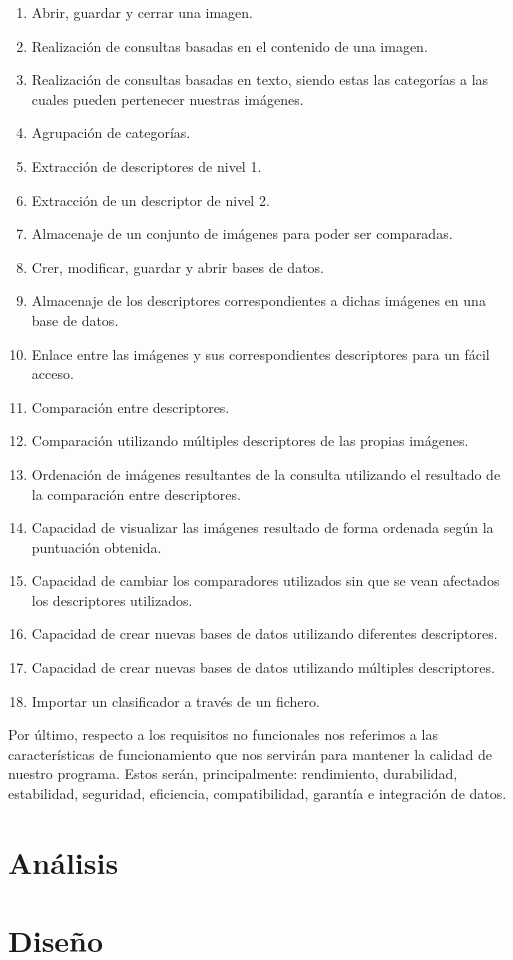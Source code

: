 \begin{enumerate}
\item Abrir, guardar y cerrar una imagen.
\item Realización de consultas basadas en el contenido de una imagen.
\item Realización de consultas basadas en texto, siendo estas las categorías a las cuales pueden pertenecer nuestras imágenes.
\item Agrupación de categorías.
\item Extracción de descriptores de nivel 1.
\item Extracción de un descriptor de nivel 2.
\item Almacenaje de un conjunto de imágenes para poder ser comparadas.
\item Crer, modificar, guardar y abrir bases de datos.
\item Almacenaje de los descriptores correspondientes a dichas imágenes en una base de datos.
\item Enlace entre las imágenes y sus correspondientes descriptores para un fácil acceso.
\item Comparación entre descriptores.
\item Comparación utilizando múltiples descriptores de las propias imágenes.
\item Ordenación de imágenes resultantes de la consulta utilizando el resultado de la comparación entre descriptores.
\item Capacidad de visualizar las imágenes resultado de forma ordenada según la puntuación obtenida.
\item Capacidad de cambiar los comparadores utilizados sin que se vean afectados los descriptores utilizados.
\item Capacidad de crear nuevas bases de datos utilizando diferentes descriptores.
\item Capacidad de crear nuevas bases de datos utilizando múltiples descriptores.
\item Importar un clasificador a través de un fichero.
\end{enumerate}
Por último, respecto a los requisitos no funcionales nos referimos a las características de funcionamiento que nos servirán para mantener la calidad de nuestro programa. Estos serán, principalmente: rendimiento, durabilidad, estabilidad, seguridad, eficiencia, compatibilidad, garantía e integración de datos.

\chapter{Análisis}

\chapter{Diseño}
